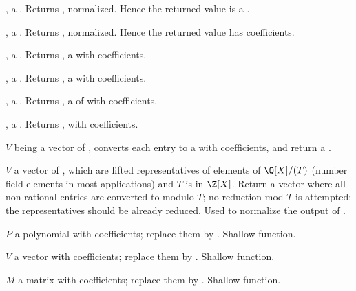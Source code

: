 ,  a . Returns , normalized. Hence the returned value is a .

,  a . Returns , normalized. Hence the returned value has  coefficients.

,  a . Returns , a  with  coefficients.

,  a . Returns , a  with  coefficients.

,  a . Returns , a  of  with  coefficients.

,  a . Returns , with  coefficients.






 $V$ being a vector of ,
converts each entry to a  with  coefficients, and return
a .

 $V$ a vector of , which
are lifted representatives of elements of $\Q[X]/(T)$ (number field elements
in most applications) and $T$ is in $\Z[X]$. Return a vector where all
non-rational entries are converted to  modulo $T$; no reduction
mod $T$ is attempted: the representatives should be already reduced. Used to
normalize the output of .

 $P$ a polynomial with 
coefficients; replace them by . Shallow function.

 $V$ a vector with 
coefficients; replace them by . Shallow function.

 $M$ a matrix with 
coefficients; replace them by . Shallow function.

